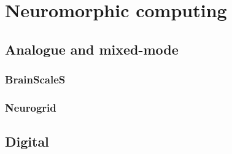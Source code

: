 	
	\section{Neuromorphic computing}
		
		
		\subsection{Analogue and mixed-mode}
			
			
			\subsubsection{BrainScaleS}
				
			
			\subsubsection{Neurogrid}
				
			
		\subsection{Digital}
			
